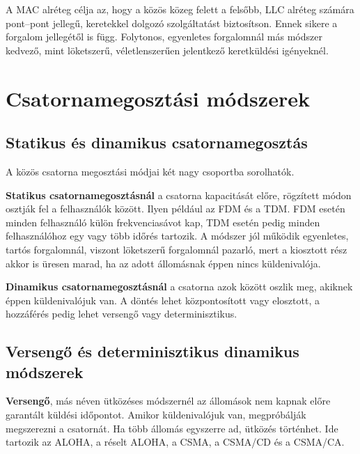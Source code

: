 A MAC alréteg célja az, hogy a közös közeg felett a felsőbb, LLC alréteg számára pont--pont jellegű, keretekkel dolgozó szolgáltatást biztosítson. Ennek sikere a forgalom jellegétől is függ. Folytonos, egyenletes forgalomnál más módszer kedvező, mint löketszerű, véletlenszerűen jelentkező keretküldési igényeknél.



\section{Csatornamegosztási módszerek}

\subsection{Statikus és dinamikus csatornamegosztás}

A közös csatorna megosztási módjai két nagy csoportba sorolhatók.

\textbf{Statikus csatornamegosztásnál} a csatorna kapacitását előre, rögzített módon osztják fel a felhasználók között. Ilyen például az FDM és a TDM. FDM esetén minden felhasználó külön frekvenciasávot kap, TDM esetén pedig minden felhasználóhoz egy vagy több időrés tartozik. A módszer jól működik egyenletes, tartós forgalomnál, viszont löketszerű forgalomnál pazarló, mert a kiosztott rész akkor is üresen marad, ha az adott állomásnak éppen nincs küldenivalója.

\textbf{Dinamikus csatornamegosztásnál} a csatorna azok között oszlik meg, akiknek éppen küldenivalójuk van. A döntés lehet központosított vagy elosztott, a hozzáférés pedig lehet versengő vagy determinisztikus.

\begin{center}

\end{center}



\subsection{Versengő és determinisztikus dinamikus módszerek}

\textbf{Versengő}, más néven ütközéses módszernél az állomások nem kapnak előre garantált küldési időpontot. Amikor küldenivalójuk van, megpróbálják megszerezni a csatornát. Ha több állomás egyszerre ad, ütközés történhet. Ide tartozik az ALOHA, a réselt ALOHA, a CSMA, a CSMA/CD és a CSMA/CA.

